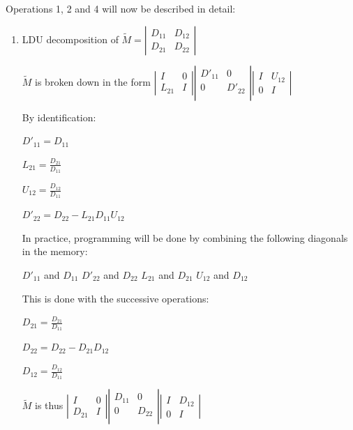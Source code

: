 Operations 1, 2 and 4 will now be described in detail:

\begin{enumerate}
  \item LDU decomposition of
$\tilde{M} =
\left|\begin{array}{cc}
  {D_{11} } & {D_{12} } \\
  {D_{21} } & {D_{22} }
\end{array}\right|$

$\widetilde{M}$ is broken down in the form
$\left|
\begin{array}{cc}
  I & 0 \\
  L_{21} & I
\end{array}
\right|
\left|
\begin{array}{cc}
  D'_{11} & 0 \\
  0 & D'_{22} \\
\end{array}
\right|
\left|
\begin{array}{cc}
  I & U_{12} \\
  0 & I
\end{array}
\right|
$

By identification:

$D'_{11} =  D_{11}$

$L_{21} = \frac{D_{21}}{D_{11}}$

$U_{12} = \frac{D_{12}}{D_{11}}$

$D'_{22} =  D_{22} - L_{21}D_{11}U_{12}$

In practice, programming will be done by combining the following diagonals in
the memory:

$D'_{11}$ and $D_{11}$ $D'_{22}$ and $D_{22}$ $L_{21}$ and $D_{21}$ $U_{12}$
and $D_{12}$

This is done with the successive operations:

$D_{21} = \frac{D_{21}}{D_{11}}$

$D_{22} = D_{22} - D_{21}D_{12}$

$D_{12} = \frac{D_{12}}{D_{11}}$

$\widetilde{M}$ is thus
$\left|
\begin{array}{cc}
  I & 0 \\
  D_{21} & I
\end{array}
\right|
\left|
\begin{array}{cc}
  D_{11} & 0 \\
  0 & D_{22} \\
\end{array}
\right|
\left|
\begin{array}{cc}
  I & D_{12} \\
  0 & I
\end{array}
\right|
$


\end{enumerate}

